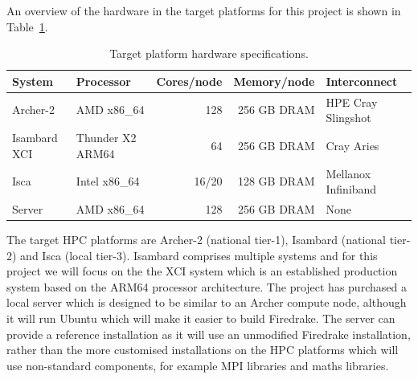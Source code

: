 \documentclass[a4paper,titlepage]{article}
\begin{document}
An overview of the hardware in the target platforms for this project is shown in Table~\ref{tab:hardware}. 
%
\begin{table}[htp]
\begin{center}
\begin{tabular}{|l|l|r|r|l|}
\hline 
System         & Processor        & Cores/node & Memory/node     & Interconnect \\
\hline
Archer-2       & AMD x86\_64         & 128        & 256 GB DRAM  & HPE Cray Slingshot  \\
Isambard XCI   & Thunder X2 ARM64    &  64        & 256 GB DRAM  & Cray Aries          \\
Isca           & Intel x86\_64       & 16/20      & 128 GB DRAM  & Mellanox Infiniband \\
Server         & AMD x86\_64         & 128        & 256 GB DRAM  & None                \\
\hline
\end{tabular}
\end{center}
\caption{Target platform hardware specifications.}
\label{tab:hardware}
\end{table}%
The target HPC platforms are Archer-2 (national tier-1), Isambard (national tier-2) and Isca (local tier-3). Isambard comprises multiple systems and for this project we will focus on the the XCI system which is an established production system based on the ARM64 processor architecture. The project has purchased a local server which is designed to be similar to an Archer compute node, although it will run Ubuntu which will make it easier to build Firedrake. The server can provide a reference installation as it will use an unmodified Firedrake installation, rather than the more customised installations on the HPC platforms which will use non-standard components, for example MPI libraries and maths libraries.
\end{document}
